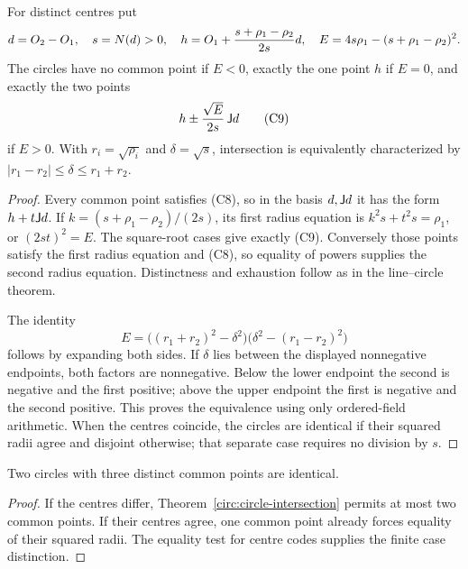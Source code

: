 \begin{theorem}
\label{circ:circle-intersection}
For distinct centres put
\[
 d=O_2-O_1,\quad s=N(d)>0,\quad
 h=O_1+\frac{s+\rho_1-\rho_2}{2s}d,\quad
 E=4s\rho_1-(s+\rho_1-\rho_2)^2.
\]
The circles have no common point if $E<0$, exactly the one point $h$ if
$E=0$, and exactly the two points
\[
 h\mathbin{\pm}\frac{\sqrt E}{2s}\,\mathsf J d              \tag{C9}
\]
if $E>0$.  With $r_i=\sqrt{\rho_i}$ and $\delta=\sqrt s$, intersection
is equivalently characterized by
$|r_1-r_2|\le\delta\le r_1+r_2$.
\end{theorem}
\begin{proof}
Every common point satisfies (C8), so in the basis $d,\mathsf J d$ it has the
form $h+t\mathsf J d$.  If $k=(s+\rho_1-\rho_2)/(2s)$, its first radius
equation is $k^2s+t^2s=\rho_1$, or $(2st)^2=E$.
The square-root cases give exactly (C9).  Conversely those points satisfy
the first radius equation and (C8), so equality of powers supplies the
second radius equation.  Distinctness and exhaustion follow as in the
line--circle theorem.

The identity
\[
 E=\bigl((r_1+r_2)^2-\delta^2\bigr)
       \bigl(\delta^2-(r_1-r_2)^2\bigr)
\]
follows by expanding both sides.  If $\delta$ lies between the displayed
nonnegative endpoints, both factors are nonnegative.  Below the lower
endpoint the second is negative and the first positive; above the upper
endpoint the first is negative and the second positive.  This proves the
equivalence using only ordered-field arithmetic.  When the centres
coincide, the circles are identical if their squared radii agree and
disjoint otherwise; that separate case requires no division by $s$.
\end{proof}

\begin{corollary}
\label{circ:three-common}
Two circles with three distinct common points are identical.
\end{corollary}
\begin{proof}
If the centres differ, Theorem~\ref{circ:circle-intersection} permits at
most two common points.  If their centres agree, one common point already
forces equality of their squared radii.  The equality test for centre codes
supplies the finite case distinction.
\end{proof}

